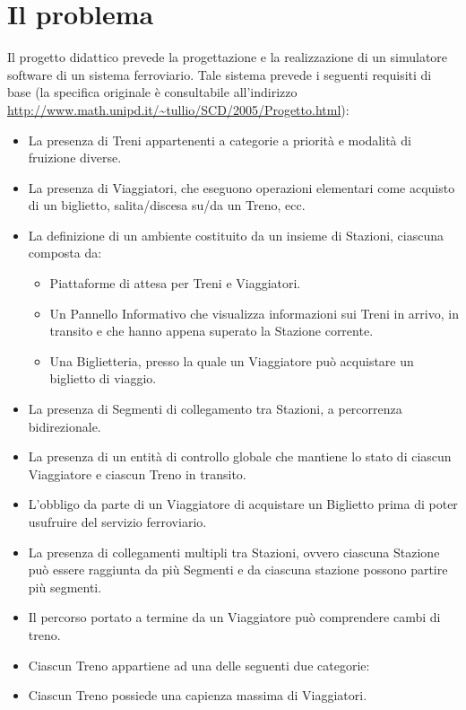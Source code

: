 \chapter{Il problema}

Il progetto didattico prevede la progettazione e la realizzazione di un simulatore software di un sistema ferroviario. Tale sistema prevede i seguenti requisiti di base (la specifica originale è consultabile all'indirizzo \url{http://www.math.unipd.it/~tullio/SCD/2005/Progetto.html}):
	\begin{itemize}
		\item La presenza di Treni appartenenti a categorie a priorità e modalità di fruizione diverse. 
		\item La presenza di Viaggiatori, che eseguono operazioni elementari come acquisto di un biglietto, salita/discesa su/da un Treno, ecc.
		\item La definizione di un ambiente costituito da un insieme di Stazioni, ciascuna composta da:
			\begin{itemize}
				\item Piattaforme di attesa per Treni e Viaggiatori.
				\item Un Pannello Informativo che visualizza informazioni sui Treni in arrivo, in transito e che hanno appena superato la Stazione corrente.
				\item Una Biglietteria, presso la quale un Viaggiatore può acquistare un biglietto di viaggio.
			\end{itemize}
		\item La presenza di Segmenti di collegamento tra Stazioni, a percorrenza bidirezionale.
		\item La presenza di un entità di controllo globale che mantiene lo stato di ciascun Viaggiatore e ciascun Treno in transito.
		\item L'obbligo da parte di un Viaggiatore di acquistare un Biglietto prima di poter usufruire del servizio ferroviario.
		\item La presenza di collegamenti multipli tra Stazioni, ovvero ciascuna Stazione può essere raggiunta da più Segmenti e da ciascuna stazione possono partire più segmenti.
		\item Il percorso portato a termine da un Viaggiatore può comprendere cambi di treno.
		\item Ciascun Treno appartiene ad una delle seguenti due categorie:
		\item Ciascun Treno possiede una capienza massima di Viaggiatori.
	\end{itemize}
